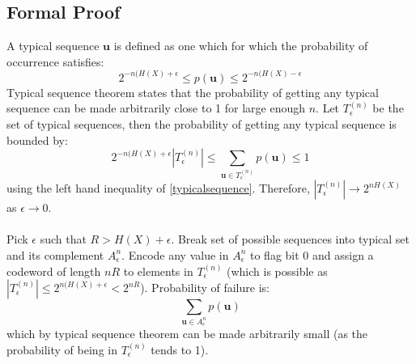 \documentclass{article}
\begin{document}
\subsection{Formal Proof}
A typical sequence $\bm u$ is defined as one which for which the probability of occurrence satisfies:
\begin{equation}
2^{-n(H(X)+\epsilon}\leq p(\bm u) \leq2^{-n(H(X)-\epsilon}
\label{typicalsequence}
\end{equation}
Typical sequence theorem states that the probability of getting any typical sequence can be made arbitrarily close to 1 for large enough $n$. Let $T_{\epsilon}^{(n)}$ be the set of typical sequences, then the probability of getting any typical sequence is bounded by:
$$ 2^{-n(H(X)+\epsilon}|T_{\epsilon}^{(n)}| \leq
\sum_{\bm u \in T_{\epsilon}^{(n)}} p(\bm u) \leq 1
$$
using the left hand inequality of \ref{typicalsequence}. Therefore, $|T_{\epsilon}^{(n)}| \rightarrow 2^{n H(X)}$ as $\epsilon \rightarrow 0$.\\\\
Pick $\epsilon$ such that $R> H(X) + \epsilon$. Break set of possible sequences into typical set and its complement $A^{n}_{\epsilon}$. Encode any value in $A^{n}_{\epsilon}$ to flag bit $0$ and assign a codeword of length $n R$ to elements in $T_{\epsilon}^{(n)}$ (which is possible as  $|T_{\epsilon}^{(n)}| \leq 2^{n(H(X)+\epsilon} < 2^{n R}$). Probability of failure is:
\begin{equation}
    \sum_{\bm u \in A^{n}_{\epsilon}}p(\bm u)
\end{equation}
which by typical sequence theorem can be made arbitrarily small (as the probability of being in  $T_{\epsilon}^{(n)}$ tends to 1).
\end{document}
